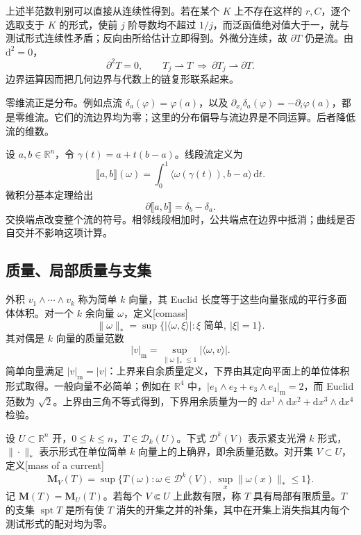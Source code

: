 上述半范数判别可以直接从连续性得到。若在某个 \(K\) 上不存在这样的 \(r,C\)，逐个选取支于 \(K\) 的形式，使前 \(j\) 阶导数均不超过 \(1/j\)，而泛函值绝对值大于一，就与测试形式连续性矛盾；反向由所给估计立即得到。外微分连续，故 \(\partial T\) 仍是流。由 \(\mathrm d^2=0\)，
\[
	\partial^2T=0,\qquad
	T_j\rightharpoonup T\ \Longrightarrow\ \partial T_j\rightharpoonup\partial T.
\]
边界运算因而把几何边界与代数上的链复形联系起来。

零维流正是分布。例如点流 \(\delta_a(\varphi)=\varphi(a)\)，以及 \(\partial_{x_i}\delta_a(\varphi)=-\partial_i\varphi(a)\)，都是零维流。它们的流边界均为零；这里的分布偏导与流边界是不同运算。后者降低流的维数。

\begin{example}\label{g3:exm:oriented-segment-current}
	设 \(a,b\in\mathbb R^n\)，令 \(\gamma(t)=a+t(b-a)\)。线段流定义为
	\[
		\lBrack a,b\rBrack(\omega)=\int_0^1\langle\omega(\gamma(t)),b-a\rangle\,\mathrm dt.
	\]
	微积分基本定理给出
	\[
		\partial\lBrack a,b\rBrack=\delta_b-\delta_a.
	\]
	交换端点改变整个流的符号。相邻线段相加时，公共端点在边界中抵消；曲线是否自交并不影响这项计算。
\end{example}

\subsection{质量、局部质量与支集}
\label{g3:subsec:2201:02}
外积 \(v_1\wedge\cdots\wedge v_k\) 称为简单 \(k\) 向量，其 Euclid 长度等于这些向量张成的平行多面体体积。对一个 \(k\) 余向量 \(\omega\)，定义[comass]
\[
	\|\omega\|_*=\sup\{|\langle\omega,\xi\rangle|:\xi\text{ 简单},\ |\xi|=1\}.
\]
其对偶是 \(k\) 向量的质量范数
\[
	|v|_{\mathrm m}=\sup_{\|\omega\|_*\le1}|\langle\omega,v\rangle|.
\]
简单向量满足 \(|v|_{\mathrm m}=|v|\)：上界来自余质量定义，下界由其定向平面上的单位体积形式取得。一般向量不必简单；例如在 \(\mathbb R^4\) 中，\(|e_1\wedge e_2+e_3\wedge e_4|_{\mathrm m}=2\)，而 Euclid 范数为 \(\sqrt2\)。上界由三角不等式得到，下界用余质量为一的 \(\mathrm dx^1\wedge\mathrm dx^2+\mathrm dx^3\wedge\mathrm dx^4\) 检验。

\begin{definition}\label{g3:def:current-mass}
	设 \(U\subset\mathbb R^n\) 开，\(0\le k\le n\)，\(T\in\mathcal D_k(U)\)。下式 \(\mathcal D^k(V)\) 表示紧支光滑 \(k\) 形式，\(\|\cdot\|_*\) 表示形式在单位简单 \(k\) 向量上的上确界，即余质量范数。对开集 \(V\subset U\)，定义[mass of a current]
	\[
		\mathbf M_V(T)=\sup\{T(\omega):\omega\in\mathcal D^k(V),\ \sup_x\|\omega(x)\|_*\le1\}.
	\]
	记 \(\mathbf M(T)=\mathbf M_U(T)\)。若每个 \(V\Subset U\) 上此数有限，称 \(T\) 具有局部有限质量。\(T\) 的支集 \(\operatorname{spt}T\) 是所有使 \(T\) 消失的开集之并的补集，其中在开集上消失指其内每个测试形式的配对均为零。
\end{definition}


